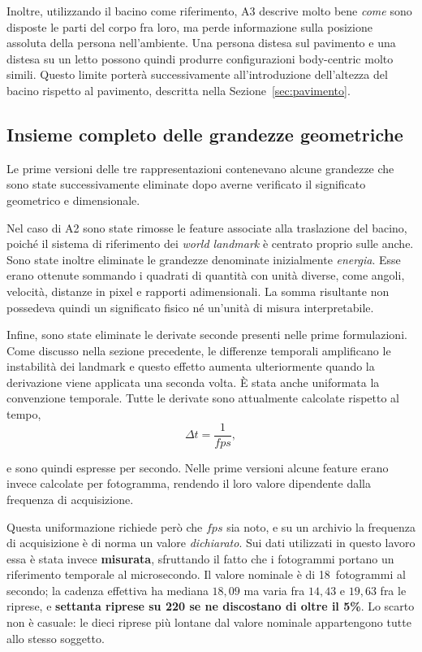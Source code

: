 Inoltre, utilizzando il bacino come riferimento, A3 descrive molto bene \emph{come} sono disposte le parti del corpo fra loro, ma perde informazione sulla posizione assoluta della persona nell'ambiente. Una persona distesa sul pavimento e una distesa su un letto possono quindi produrre configurazioni body-centric molto simili. Questo limite porterà successivamente all'introduzione dell'altezza del bacino rispetto al pavimento, descritta nella Sezione~\ref{sec:pavimento}.

\subsection{Insieme completo delle grandezze geometriche}

Le prime versioni delle tre rappresentazioni contenevano alcune grandezze che sono state successivamente eliminate dopo averne verificato il significato geometrico e dimensionale.

Nel caso di A2 sono state rimosse le feature associate alla traslazione del bacino, poiché il sistema di riferimento dei \emph{world landmark} è centrato proprio sulle anche. Sono state inoltre eliminate le grandezze denominate inizialmente \emph{energia}. Esse erano ottenute sommando i quadrati di quantità con unità diverse, come angoli, velocità, distanze in pixel e rapporti adimensionali. La somma risultante non possedeva quindi un significato fisico né un'unità di misura interpretabile.

Infine, sono state eliminate le derivate seconde presenti nelle prime formulazioni. Come discusso nella sezione precedente, le differenze temporali amplificano le instabilità dei landmark e questo effetto aumenta ulteriormente quando la derivazione viene applicata una seconda volta. È stata anche uniformata la convenzione temporale. Tutte le derivate sono attualmente calcolate rispetto al tempo,
\[
\Delta t = \frac{1}{fps},
\]

e sono quindi espresse per secondo. Nelle prime versioni alcune feature erano invece calcolate per fotogramma, rendendo il loro valore dipendente dalla frequenza di acquisizione.

Questa uniformazione richiede però che $fps$ sia noto, e su un archivio la frequenza di acquisizione è di norma un valore \emph{dichiarato}. Sui dati utilizzati in questo lavoro essa è stata invece \textbf{misurata}, sfruttando il fatto che i fotogrammi portano un riferimento temporale al microsecondo. Il valore nominale è di 18~fotogrammi al secondo; la cadenza effettiva ha mediana $18{,}09$ ma varia fra $14{,}43$ e $19{,}63$ fra le riprese, e \textbf{settanta riprese su 220 se ne discostano di oltre il 5\%}. Lo scarto non è casuale: le dieci riprese più lontane dal valore nominale appartengono tutte allo stesso soggetto.

